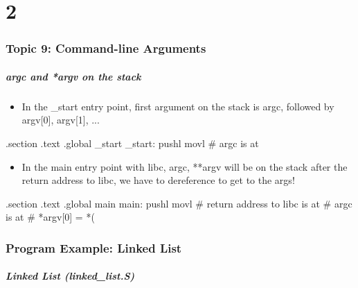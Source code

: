 \documentclass[11pt,xcolor=dvipsnames]{beamer}
\newcommand{\mvs}{\vspace{-0.95em}}
\begin{document}
\part{2}

\section{Topic 9: Command-line Arguments}

\begin{frame}[fragile,t]
\frametitle{{\ttfamily argc} and {\ttfamily **argv} on the stack}
\mvs
\begin{itemize}
  \item In the {\ttfamily \_start} entry point, first argument on the stack is {\ttfamily argc}, followed by {\ttfamily argv[0], argv[1], ...}
\end{itemize}
\begin{gascode}
.section .text
.global _start
_start:
  pushl %
  movl %
  # argc is at %
\end{gascode}
\begin{itemize}
  \item In the {\ttfamily main} entry point with libc, {\ttfamily argc, **argv} will be on the stack after the return address to libc, we have to dereference to get to the args!
\end{itemize}
\begin{gascode}
.section .text
.global main
main:
  pushl %
  movl %
  # return address to libc is at %
  # argc is at %
  # *argv[0] = *(%
\end{gascode}
\end{frame}

\section{Program Example: Linked List}

\begin{frame}[fragile,t]
\frametitle{Linked List (linked\_list.S)}
\mvs
{}
\end{frame}
\end{document}
